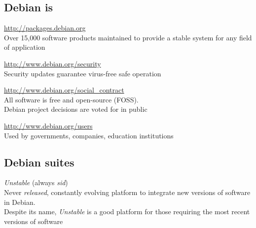 \documentclass[letterpaper,landscape]{report}
\begin{document}
\begin{multicols}{3}
\subsection*{Debian is}
\begin{description}[nolistsep,leftmargin=0.8em]
\item[V\textnormal{ersatile}]\hfill\url{http://packages.debian.org}\\
  Over 15,000 software products maintained to provide
  a stable system for any field of application
\item[S\textnormal{ecure}]\hfill\url{http://www.debian.org/security}\\
  Security updates guarantee virus-free safe operation
\item[O\textnormal{pen}]\hfill\url{http://www.debian.org/social_contract}\\
  All software is free and open-source (FOSS).\\
  Debian project decisions are voted for in public
\item[P\textnormal{opular}]\hfill\url{http://www.debian.org/users}\\
  Used by governments, companies, education institutions
\end{description}

\columnbreak
\subsection*{Debian suites}


\begin{description}[nolistsep,leftmargin=1pc,topsep=1em]

\item[Development]\hfill\emph{Unstable} (always \emph{sid})\\
  Never \emph{released}, constantly evolving platform to integrate new
  versions of software in Debian.\\
  Despite its name, \emph{Unstable} is a good platform for those
  requiring the most recent versions of software


\end{description}
\end{multicols}
\end{document}
